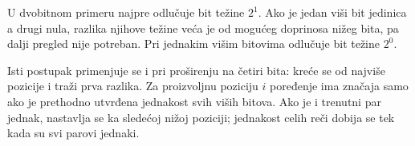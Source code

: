 U dvobitnom primeru najpre odlučuje bit težine $2^1$. Ako je jedan viši bit jedinica a drugi nula, razlika njihove težine veća je od mogućeg doprinosa nižeg bita, pa dalji pregled nije potreban. Pri jednakim višim bitovima odlučuje bit težine $2^0$.

Isti postupak primenjuje se i pri proširenju na četiri bita: kreće se od najviše pozicije i traži prva razlika. Za proizvoljnu poziciju $i$ poređenje ima značaja samo ako je prethodno utvrđena jednakost svih viših bitova. Ako je i trenutni par jednak, nastavlja se ka sledećoj nižoj poziciji; jednakost celih reči dobija se tek kada su svi parovi jednaki.
